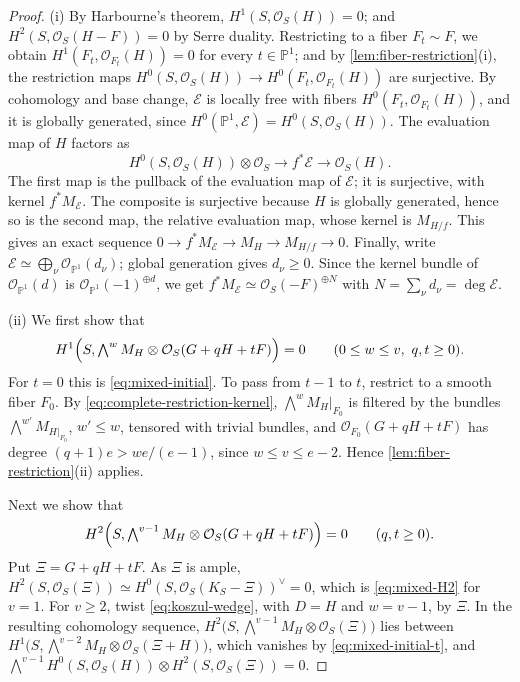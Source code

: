 \documentclass[11pt,reqno]{amsart}
\numberwithin{equation}{section}
\theoremstyle{remark}
\newcommand{\sshf}[1]{\mathcal{O}_{#1}}
\newcommand{\shf}[1]{\mathscr{#1}}
\newcommand{\prj}[1]{\mathbb{P}^{#1}}
\begin{document}
\begin{proof}
(i) By Harbourne's theorem, \(H^1(S,\sshf{S}(H))=0\); and \(H^2(S,\sshf{S}(H-F))
=0\) by Serre duality. Restricting to a fiber \(F_t\sim F\), we obtain \(H^1(F_t,\sshf{F_t}(H))=0\) for every \(t\in\prj{1}\); and by \cref{lem:fiber-restriction}\textup{(i)}, the restriction maps \(H^0(S,\sshf{S}(H))\to H^0(F_t,\sshf{F_t}(H))\) are surjective. By cohomology and base change, \(\shf{E}\) is locally free with fibers \(H^0(F_t,\sshf{F_t}(H))\), and it is globally generated, since \(H^0(\prj{1},\shf{E})=H^0(S,\sshf{S}(H))\). The evaluation map of \(H\) factors as
\[
 H^0(S,\sshf{S}(H))\otimes\sshf{S}\longrightarrow f^*\shf{E}\longrightarrow\sshf{S}(H).
\]
The first map is the pullback of the evaluation map of \(\shf{E}\); it is surjective, with kernel \(f^*M_{\shf{E}}\). The composite is surjective because \(H\) is globally generated, hence so is the second map, the relative evaluation map, whose kernel is \(M_{H/f}\). This gives an exact sequence \(0\to f^*M_{\shf{E}}\to M_H\to M_{H/f}\to0\). Finally, write \(\shf{E}\simeq\bigoplus_\nu\sshf{\prj{1}}(d_\nu)\); global generation gives \(d_\nu\geq0\). Since the kernel bundle of \(\sshf{\prj{1}}(d)\) is \(\sshf{\prj{1}}(-1)^{\oplus d}\), we get \(f^*M_{\shf{E}}\simeq\sshf{S}(-F)^{\oplus N}\) with \(N=\sum_\nu d_\nu=\deg\shf{E}\).

(ii) We first show that
\begin{equation}\label{eq:mixed-initial-t}
 H^1\Bigl(S,\textstyle\bigwedge^wM_H\otimes\sshf{S}(G+qH+tF)\Bigr)=0
 \qquad(0\leq w\leq v,\ q,t\geq0).
\end{equation}
For \(t=0\) this is \eqref{eq:mixed-initial}. To pass from \(t-1\) to \(t\), restrict to a smooth fiber \(F_0\). By \eqref{eq:complete-restriction-kernel}, \(\bigwedge^wM_H|_{F_0}\) is filtered by the bundles \(\bigwedge^{w'}M_{H|_{F_0}}\), \(w'\leq w\), tensored with trivial bundles, and \(\sshf{F_0}(G+qH+tF)\) has degree \((q+1)e>we/(e-1)\), since \(w\leq v\leq e-2\). Hence \cref{lem:fiber-restriction}\textup{(ii)} applies.

Next we show that
\begin{equation}\label{eq:mixed-H2}
 H^2\Bigl(S,\textstyle\bigwedge^{v-1}M_H\otimes\sshf{S}(G+qH+tF)\Bigr)=0
 \qquad(q,t\geq0).
\end{equation}
Put \(\Xi=G+qH+tF\). As \(\Xi\) is ample, \(H^2(S,\sshf{S}(\Xi))\simeq H^0(S,\sshf{S}(K_S-\Xi))^\vee=0\), which is \eqref{eq:mixed-H2} for \(v=1\). For \(v\geq2\), twist \eqref{eq:koszul-wedge}, with \(D=H\) and \(w=v-1\), by \(\Xi\). In the resulting cohomology sequence, \(H^2\bigl(S,\bigwedge^{v-1}M_H\otimes\sshf{S}(\Xi)\bigr)\) lies between \(H^1\bigl(S,\bigwedge^{v-2}M_H\otimes\sshf{S}(\Xi+H)\bigr)\), which vanishes by \eqref{eq:mixed-initial-t}, and \(\bigwedge^{v-1}H^0(S,\sshf{S}(H))\otimes H^2(S,\sshf{S}(\Xi))=0\).


\end{proof}
\end{document}
